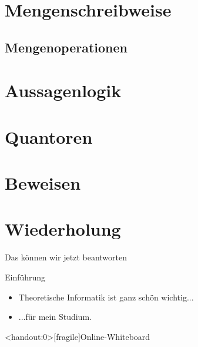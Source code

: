

\section{Mengenschreibweise}



\subsection{Mengenoperationen}



\section{Aussagenlogik}



\section{Quantoren}



\section{Beweisen}



\section{Wiederholung}
\begin{frame}[fragile]{Das können wir jetzt beantworten}
	\begin{alertblock}{Einführung}
		\begin{itemize}
			\item Theoretische Informatik ist ganz schön wichtig...
			\item ...für mein Studium.
		\end{itemize}
	\end{alertblock}
\end{frame}









\appendix

\begin{frame}<handout:0>[fragile]{Online-Whiteboard}
	\phantom{text}
\end{frame}


